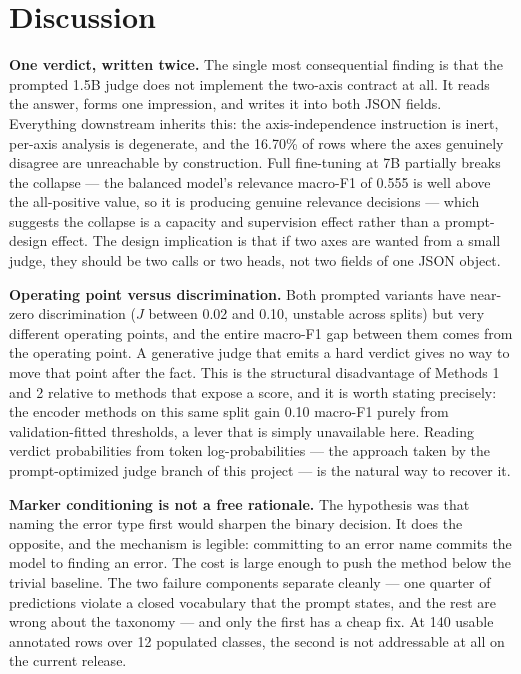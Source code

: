 \documentclass{zapiski}
\begin{document}
\section{Discussion}
\label{sec:discussion}

\textbf{One verdict, written twice.} The single most consequential finding is
that the prompted 1.5B judge does not implement the two-axis contract at all.
It reads the answer, forms one impression, and writes it into both JSON
fields. Everything downstream inherits this: the axis-independence instruction
is inert, per-axis analysis is degenerate, and the 16.70\% of rows where the
axes genuinely disagree are unreachable by construction. Full fine-tuning at
7B partially breaks the collapse --- the balanced model's relevance macro-F1
of 0.555 is well above the all-positive value, so it is producing genuine
relevance decisions --- which suggests the collapse is a capacity and
supervision effect rather than a prompt-design effect. The design implication
is that if two axes are wanted from a small judge, they should be two calls or
two heads, not two fields of one JSON object.

\textbf{Operating point versus discrimination.} Both prompted variants have
near-zero discrimination ($J$ between 0.02 and 0.10, unstable across splits)
but very different operating points, and the entire macro-F1 gap between them
comes from the operating point. A generative judge that emits a hard verdict
gives no way to move that point after the fact. This is the structural
disadvantage of Methods 1 and 2 relative to methods that expose a score, and
it is worth stating precisely: the encoder methods on this same split gain
0.10 macro-F1 purely from validation-fitted thresholds, a lever that is simply
unavailable here. Reading verdict probabilities from token log-probabilities
--- the approach taken by the prompt-optimized judge branch of this project
--- is the natural way to recover it.

\textbf{Marker conditioning is not a free rationale.} The hypothesis was that
naming the error type first would sharpen the binary decision. It does the
opposite, and the mechanism is legible: committing to an error name commits
the model to finding an error. The cost is large enough to push the method
below the trivial baseline. The two failure components separate cleanly ---
one quarter of predictions violate a closed vocabulary that the prompt
states, and the rest are wrong about the taxonomy --- and only the first has a
cheap fix. At 140 usable annotated rows over 12 populated classes, the second
is not addressable at all on the current release.
\end{document}
